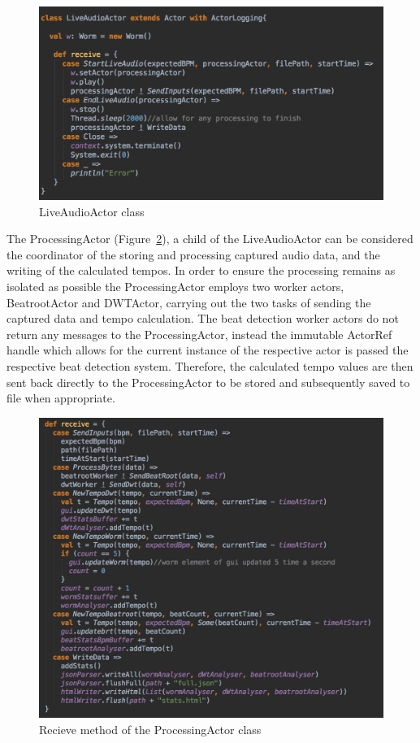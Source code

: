 \documentclass[a4paper, 11pt]{article}
\begin{document}
\begin{figure}
\centering
\includegraphics[scale=0.3]{images/LiveAudioActor.jpg}
\caption{LiveAudioActor class}
\label{fig: liveaudioactor}
\end{figure}

The ProcessingActor (Figure~\ref{fig: processingActor}), a child of the LiveAudioActor can be considered the coordinator of the storing and processing captured audio data, and the writing of the calculated tempos. In order to ensure the processing remains as isolated as possible the ProcessingActor employs two worker actors, BeatrootActor and DWTActor, carrying out the two tasks of sending the captured data and tempo calculation. The beat detection worker actors do not return any messages to the ProcessingActor, instead the immutable ActorRef handle which allows for the current instance of the respective actor is passed the respective beat detection system. Therefore, the calculated tempo values are then sent back directly to the ProcessingActor to be stored and subsequently saved to file when appropriate.\par

\begin{figure}
\centering
\includegraphics[scale=0.3]{images/processingRec.jpg}
\caption{Recieve method of the ProcessingActor class}
\label{fig: processingActor}
\end{figure}
\end{document}
